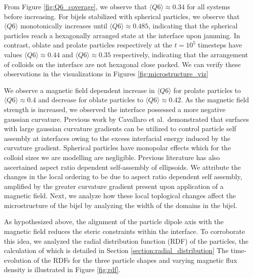 From Figure \ref{fig:Q6_coverage}, we observe that
\(\langle Q6 \rangle \approx 0.34\) for all systems before increasing.
For bijels stabilized with spherical particles, we observe that
\(\langle Q6 \rangle\) monotonically increases until
\(\langle Q6 \rangle \approx 0.485\), indicating that the spherical
particles reach a hexagonally arranged state at the interface upon
jamming. In contrast, oblate and prolate particles respectively at the
\(t = 10^5\) timesteps have values \(\langle Q6 \rangle \approx 0.44\)
and \(\langle Q6 \rangle \approx 0.35\) respectively, indicating that
the arrangement of colloids on the interface are not hexagonal close
packed. We can verify these observations in the visualizations in
Figures \ref{fig:microstructure_viz}

We observe a magnetic field dependent increase in \(\langle Q6 \rangle\)
for prolate particles to \(\langle Q6 \rangle \approx 0.4\) and decrease
for oblate particles to \(\langle Q6 \rangle \approx 0.42\). As the
magnetic field strength is increased, we observed the interface
possessed a more negative gaussian curvature. Previous work by Cavallaro
et al.~demonstrated that surfaces with large gaussian curvature
gradients can be utilized to control particle self assembly at
interfaces owing to the excess interfacial energy induced by the
curvature gradient. \cite{cavallaro_curvature-driven_2011} Spherical
particles have monopolar effects which for the colloid sizes we are
modelling are negligible. Previous literature has also ascertained
aspect ratio dependent self-assembly of ellipsoids. We attribute the
changes in the local ordering to be due to aspect ratio dependent self
assembly, amplified by the greater curvature gradient present upon
application of a magnetic field. Next, we analyze how these local
toplogical changes affect the microstructure of the bijel by analyzing
the width of the domains in the bijel.

As hypothesized above, the alignment of the particle dipole axis with
the magnetic field reduces the steric constraints within the interface.
To corroborate this idea, we analyzed the radial distribution function
(RDF) of the particles, the calculation of which is detailed in Section
\ref{section:radial_distribution} The time-evolution of the RDFs for the three particle shapes and
varying magnetic flux density is illustrated in Figure \ref{fig:rdf}.

